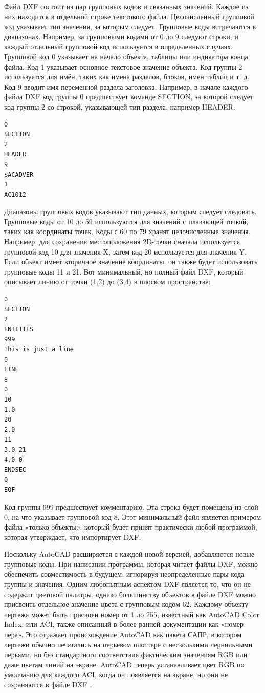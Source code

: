 Файл DXF состоит из пар групповых кодов и связанных значений. Каждое из них находится в отдельной строке текстового файла. Целочисленный групповой код указывает тип значения, за которым следует. Групповые коды встречаются в диапазонах. Например, за групповыми кодами от 0 до 9 следуют строки, и каждый отдельный групповой код используется в определенных случаях. Групповой код 0 указывает на начало объекта, таблицы или индикатора конца файла. Код 1 указывает основное текстовое значение объекта. Код группы 2 используется для имён, таких как имена разделов, блоков, имен таблиц и т. д. Код 9 вводит имя переменной раздела заголовка. Например, в начале каждого файла DXF код группы 0 предшествует команде SECTION, за которой следует код группы 2 со строкой, указывающей тип раздела, например HEADER:

\begin{lstlisting}[label=list:dxfheader]
0
SECTION
2
HEADER
9
$ACADVER
1
AC1012
\end{lstlisting}

Диапазоны групповых кодов указывают тип данных, которым следует следовать. Групповые коды от 10 до 59 используются для значений с плавающей точкой, таких как координаты точек. Коды с 60 по 79 хранят целочисленные значения. Например, для сохранения местоположения 2D-точки сначала используется групповой код 10 для значения X, затем код 20 используется для значения Y. Если объект имеет вторичное значение координаты, он также будет использовать групповые коды 11 и 21. Вот минимальный, но полный файл DXF, который описывает линию от точки (1,2) до (3,4) в плоском пространстве:

\begin{lstlisting}[label=list:dxflinefull]
0
SECTION
2
ENTITIES
999
This is just a line
0
LINE
8
0
10
1.0
20
2.0
11
3.0 21
4.0 0
ENDSEC
0
EOF
\end{lstlisting}

Код группы 999 предшествует комментарию. Эта строка будет помещена на слой 0, на что указывает групповой код 8. Этот минимальный файл является примером файла «только объекты», который будет принят практически любой программой, которая утверждает, что импортирует DXF.

Поскольку AutoCAD расширяется с каждой новой версией, добавляются новые групповые коды. При написании программы, которая читает файлы DXF, можно обеспечить совместимость в будущем, игнорируя неопределенные пары кода группы и значения.
Одним любопытным аспектом DXF является то, что он не содержит цветовой палитры, однако большинству объектов в файле DXF можно присвоить отдельное значение цвета с групповым кодом 62. Каждому объекту чертежа может быть присвоен номер от 1 до 255, известный как AutoCAD Color Index, или ACI, также описанный в более ранней документации как «номер пера». Это отражает происхождение AutoCAD как пакета САПР, в котором чертежи обычно печатались на перьевом плоттере с несколькими чернильными перьями, но без стандартного соответствия фактическим значениям RGB или даже цветам линий на экране. AutoCAD теперь устанавливает цвет RGB по умолчанию для каждого ACI, когда он появляется на экране, но они не сохраняются в файле DXF \cite{murray1996encyclopedia}.

